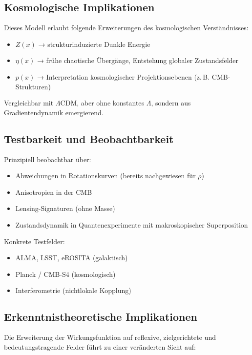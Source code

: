 \documentclass[11pt]{article}
\begin{document}
\subsection*{Kosmologische Implikationen}

Dieses Modell erlaubt folgende Erweiterungen des kosmologischen Verständnisses:

\begin{itemize}
  \item $Z(x)$ → strukturinduzierte Dunkle Energie
  \item $\eta(x)$ → frühe chaotische Übergänge, Entstehung globaler Zustandsfelder
  \item $p(x)$ → Interpretation kosmologischer Projektionsebenen (z.\,B. CMB-Strukturen)
\end{itemize}

Vergleichbar mit $\Lambda$CDM, aber ohne konstantes $\Lambda$, sondern aus Gradientendynamik emergierend.

\subsection*{Testbarkeit und Beobachtbarkeit}

Prinzipiell beobachtbar über:

\begin{itemize}
  \item Abweichungen in Rotationskurven (bereits nachgewiesen für $\rho$)
  \item Anisotropien in der CMB
  \item Lensing-Signaturen (ohne Masse)
  \item Zustandsdynamik in Quantenexperimente mit makroskopischer Superposition
\end{itemize}

Konkrete Testfelder:
\begin{itemize}
  \item ALMA, LSST, eROSITA (galaktisch)
  \item Planck / CMB-S4 (kosmologisch)
  \item Interferometrie (nichtlokale Kopplung)
\end{itemize}

\subsection*{Erkenntnistheoretische Implikationen}

Die Erweiterung der Wirkungsfunktion auf reflexive, zielgerichtete und bedeutungstragende Felder  
führt zu einer veränderten Sicht auf:
\end{document}
